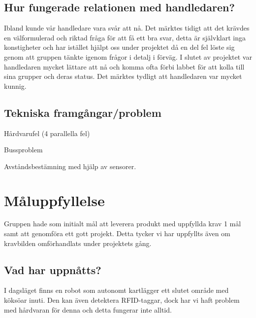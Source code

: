 \documentclass[a4paper,12pt,fleqn]{article}
\begin{document}
\subsection{Hur fungerade relationen med handledaren?}
Ibland kunde vår handledare vara svår att nå. Det märktes tidigt att det krävdes en välformulerad och riktad fråga för att få ett bra svar, detta är självklart inga konstigheter och har istället hjälpt oss under projektet då en del fel löste sig genom att gruppen tänkte igenom frågor i detalj i förväg. I slutet av projektet var handledaren mycket lättare att nå och komma ofta förbi labbet för att kolla till sina grupper och deras status. Det märktes tydligt att handledaren var mycket kunnig.

\subsection{Tekniska framgångar/problem}

Hårdvarufel (4 parallella fel)

Bussproblem

Avståndsbestämning med hjälp av sensorer. 

\section{Måluppfyllelse}
Gruppen hade som initialt mål att leverera produkt med uppfyllda krav 1 mål samt att genomföra ett gott projekt. Detta tycker vi har uppfyllts även om kravbilden omförhandlats under projektets gång.
\subsection{Vad har uppnåtts?}
I dagsläget finns en robot som autonomt kartlägger ett slutet område med köksöar inuti. Den kan även detektera RFID-taggar, dock har vi haft problem med hårdvaran för denna och detta fungerar inte alltid. 
\end{document}
